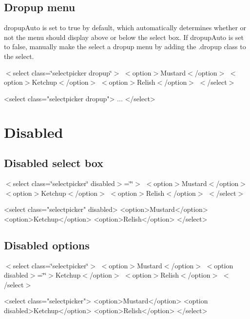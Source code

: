 \subsection*{Dropup menu}

{\ttfamily dropup\+Auto} is set to true by default, which automatically determines whether or not the menu should display above or below the select box. If {\ttfamily dropup\+Auto} is set to false, manually make the select a dropup menu by adding the {\ttfamily .dropup} class to the select.

 $<$select class=\char`\"{}selectpicker dropup\char`\"{}$>$ $<$option$>$Mustard$<$/option$>$ $<$option$>$Ketchup$<$/option$>$ $<$option$>$Relish$<$/option$>$ $<$/select$>$ 


\begin{DoxyCode}
<select class="selectpicker dropup">
  ...
</select>
\end{DoxyCode}


\section*{Disabled}





\subsection*{Disabled select box}

 $<$select class=\char`\"{}selectpicker\char`\"{} disabled$>$=\char`\"{}\char`\"{}$>$ $<$option$>$Mustard$<$/option$>$ $<$option$>$Ketchup$<$/option$>$ $<$option$>$Relish$<$/option$>$ $<$/select$>$ 


\begin{DoxyCode}
<select class="selectpicker" disabled>
  <option>Mustard</option>
  <option>Ketchup</option>
  <option>Relish</option>
</select>
\end{DoxyCode}


\subsection*{Disabled options}

 $<$select class=\char`\"{}selectpicker\char`\"{}$>$ $<$option$>$Mustard$<$/option$>$ $<$option disabled$>$=\char`\"{}\char`\"{}$>$Ketchup$<$/option$>$ $<$option$>$Relish$<$/option$>$ $<$/select$>$ 


\begin{DoxyCode}
<select class="selectpicker">
  <option>Mustard</option>
  <option disabled>Ketchup</option>
  <option>Relish</option>
</select>
\end{DoxyCode}



